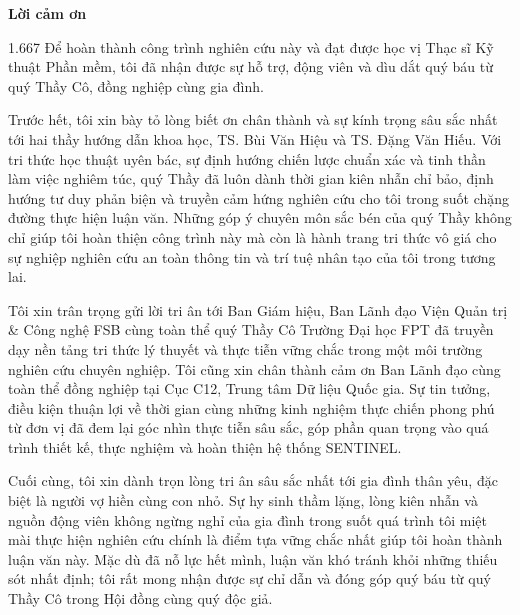 \documentclass[12pt,a4paper]{report}
\begin{document}
\newpage
{}
\begin{center}
    {\Large\textbf{Lời cảm ơn}}
\end{center}
\vspace{0.5cm}

\begin{spacing}{1.667}
Để hoàn thành công trình nghiên cứu này và đạt được học vị Thạc sĩ Kỹ thuật Phần mềm, tôi đã nhận được sự hỗ trợ, động viên và dìu dắt quý báu từ quý Thầy Cô, đồng nghiệp cùng gia đình.

Trước hết, tôi xin bày tỏ lòng biết ơn chân thành và sự kính trọng sâu sắc nhất tới hai thầy hướng dẫn khoa học, TS. Bùi Văn Hiệu và TS. Đặng Văn Hiếu. Với tri thức học thuật uyên bác, sự định hướng chiến lược chuẩn xác và tinh thần làm việc nghiêm túc, quý Thầy đã luôn dành thời gian kiên nhẫn chỉ bảo, định hướng tư duy phản biện và truyền cảm hứng nghiên cứu cho tôi trong suốt chặng đường thực hiện luận văn. Những góp ý chuyên môn sắc bén của quý Thầy không chỉ giúp tôi hoàn thiện công trình này mà còn là hành trang tri thức vô giá cho sự nghiệp nghiên cứu an toàn thông tin và trí tuệ nhân tạo của tôi trong tương lai.

Tôi xin trân trọng gửi lời tri ân tới Ban Giám hiệu, Ban Lãnh đạo Viện Quản trị \& Công nghệ FSB cùng toàn thể quý Thầy Cô Trường Đại học FPT đã truyền dạy nền tảng tri thức lý thuyết và thực tiễn vững chắc trong một môi trường nghiên cứu chuyên nghiệp. Tôi cũng xin chân thành cảm ơn Ban Lãnh đạo cùng toàn thể đồng nghiệp tại Cục C12, Trung tâm Dữ liệu Quốc gia. Sự tin tưởng, điều kiện thuận lợi về thời gian cùng những kinh nghiệm thực chiến phong phú từ đơn vị đã đem lại góc nhìn thực tiễn sâu sắc, góp phần quan trọng vào quá trình thiết kế, thực nghiệm và hoàn thiện hệ thống SENTINEL.

Cuối cùng, tôi xin dành trọn lòng tri ân sâu sắc nhất tới gia đình thân yêu, đặc biệt là người vợ hiền cùng con nhỏ. Sự hy sinh thầm lặng, lòng kiên nhẫn và nguồn động viên không ngừng nghỉ của gia đình trong suốt quá trình tôi miệt mài thực hiện nghiên cứu chính là điểm tựa vững chắc nhất giúp tôi hoàn thành luận văn này. Mặc dù đã nỗ lực hết mình, luận văn khó tránh khỏi những thiếu sót nhất định; tôi rất mong nhận được sự chỉ dẫn và đóng góp quý báu từ quý Thầy Cô trong Hội đồng cùng quý độc giả.
\end{spacing}


\newpage
\tableofcontents
\end{document}
